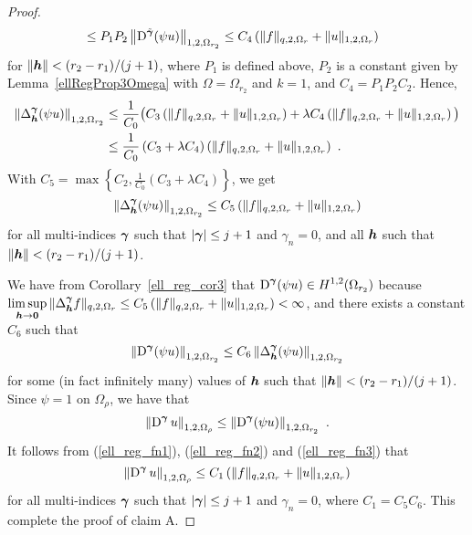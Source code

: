\begin{proof}
\begin{align*}
&\leq P_1 P_2 \left\| \operatorname{D}^{\tilde{{\bm{\gamma}}}} (\psi u)
\right\|_{1,2,\Omega_{r_2}}
\leq C_4 \left( \|f\|_{q,2,\Omega_r} + \|u\|_{1,2,\Omega_r} \right)
\end{align*}
for $\|{\bm{h}}\| < (r_2-r_1)/(j+1)$, where $P_1$ is defined above,
$P_2$ is a constant given by Lemma~\ref{ellRegProp3Omega} with
$\Omega = \Omega_{r_2}$ and $k=1$, and $C_4 = P_1 P_2 C_2$.  Hence,
\begin{align*}
\left\| \Delta^{{\bm{\gamma}}}_{{\bm{h}}} (\psi u) \right\|_{1,2,\Omega_{r_2}}
&\leq \frac{1}{C_0} \big(
C_3 \left( \|f\|_{q,2,\Omega_r} + \|u\|_{1,2,\Omega_r}\right) + \lambda
C_4 \left( \|f\|_{q,2,\Omega_r} + \|u\|_{1,2,\Omega_r} \right) \big) \\
&\leq \frac{1}{C_0} \left( C_3 + \lambda C_4 \right)
\left( \|f\|_{q,2,\Omega_r} + \|u\|_{1,2,\Omega_r}\right) \ .
\end{align*}
With $\displaystyle C_5 = \max \left\{ C_2 ,
\frac{1}{C_0} \left( C_3 + \lambda C_4 \right) \right\}$, we get
\begin{equation} \label{ell_reg_fn1}
\left\| \Delta^{{\bm{\gamma}}}_{{\bm{h}}} (\psi u) \right\|_{1,2,\Omega_{r_2}}
\leq C_5 \left( \|f\|_{q,2,\Omega_r} + \|u\|_{1,2,\Omega_r}\right)
\end{equation}
for all multi-indices ${\bm{\gamma}}$ such that $|{\bm{\gamma}}|\leq j+1$ and
$\gamma_n=0$, and all ${\bm{h}}$ such that $\|{\bm{h}}\|< (r_2-r_1)/(j+1)$.

We have from Corollary~\ref{ell_reg_cor3} that
$\displaystyle \operatorname{D}^{{\bm{\gamma}}} (\psi u) \in H^{1,2}(\Omega_{r_2})$
because
$\displaystyle \limsup_{{\bm{h}}\rightarrow {\bm{0}}}
\|\Delta^{{\bm{\gamma}}}_{{\bm{h}}} f\|_{q,2,\Omega_r}
\leq C_5 \left( \|f\|_{q,2,\Omega_r} + \|u\|_{1,2,\Omega_r}\right) < \infty$,
and there exists a constant $C_6$ such that
\begin{equation} \label{ell_reg_fn2}
\left\| \operatorname{D}^{{\bm{\gamma}}} (\psi u) \right\|_{1,2,\Omega_{r_2}} \leq C_6
\left\| \Delta^{{\bm{\gamma}}}_{{\bm{h}}} (\psi u) \right\|_{1,2,\Omega_{r_2}}
\end{equation}
for some (in fact infinitely many) values of ${\bm{h}}$ such that
$\|{\bm{h}}\| < (r_2-r_1)/(j+1)$.  Since $\psi = 1$ on $\Omega_\rho$, we
have that
\begin{equation} \label{ell_reg_fn3}
\left\| \diff^{\VEC{\gamma}} u \right\|_{1,2,\Omega_{\rho}} \leq
\left\| \diff^{\VEC{\gamma}} (\psi u) \right\|_{1,2,\Omega_{r_2}} \ .
\end{equation}
It follows from (\ref{ell_reg_fn1}), (\ref{ell_reg_fn2}) and
(\ref{ell_reg_fn3}) that
\[
\left\| \operatorname{D}^{{\bm{\gamma}}} u \right\|_{1,2,\Omega_{\rho}} \leq C_1
\left( \|f\|_{q,2,\Omega_r} + \|u\|_{1,2,\Omega_r}\right)
\]
for all multi-indices ${\bm{\gamma}}$ such that $|{\bm{\gamma}}|\leq j+1$ and
$\gamma_n =0$, where $C_1 = C_5 C_6$.  This complete the proof of
claim A.


\end{proof}
